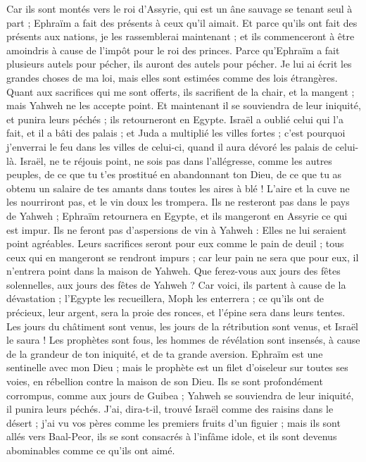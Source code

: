 \begin{multicols}{2}
Car ils sont montés vers le roi d'Assyrie, qui est un âne sauvage se tenant seul à part ; Ephraïm a fait des présents à ceux qu'il aimait.
Et parce qu'ils ont fait des présents aux nations, je les rassemblerai maintenant ; et ils commenceront à être amoindris à cause de l'impôt pour le roi des princes.
Parce qu'Ephraïm a fait plusieurs autels pour pécher, ils auront des autels pour pécher.
Je lui ai écrit les grandes choses de ma loi, mais elles sont estimées comme des lois étrangères.
Quant aux sacrifices qui me sont offerts, ils sacrifient de la chair, et la mangent ; mais Yahweh ne les accepte point. Et maintenant il se souviendra de leur iniquité, et punira leurs péchés ; ils retourneront en Egypte.
Israël a oublié celui qui l'a fait, et il a bâti des palais ; et Juda a multiplié les villes fortes ; c'est pourquoi j'enverrai le feu dans les villes de celui-ci, quand il aura dévoré les palais de celui-là.
\VerseOne{}Israël, ne te réjouis point, ne sois pas dans l'allégresse, comme les autres peuples, de ce que tu t'es prostitué en abandonnant ton Dieu, de ce que tu as obtenu un salaire de tes amants dans toutes les aires à blé !
L'aire et la cuve ne les nourriront pas, et le vin doux les trompera.
Ils ne resteront pas dans le pays de Yahweh ; Ephraïm retournera en Egypte, et ils mangeront en Assyrie ce qui est impur.
Ils ne feront pas d'aspersions de vin à Yahweh : Elles ne lui seraient point agréables. Leurs sacrifices seront pour eux comme le pain de deuil ; tous ceux qui en mangeront se rendront impurs ; car leur pain ne sera que pour eux, il n'entrera point dans la maison de Yahweh.
Que ferez-vous aux jours des fêtes solennelles, aux jours des fêtes de Yahweh ?
Car voici, ils partent à cause de la dévastation ; l'Egypte les recueillera, Moph les enterrera ; ce qu'ils ont de précieux, leur argent, sera la proie des ronces, et l'épine sera dans leurs tentes.
Les jours du châtiment sont venus, les jours de la rétribution sont venus, et Israël le saura ! Les prophètes sont fous, les hommes de révélation sont insensés, à cause de la grandeur de ton iniquité, et de ta grande aversion.
Ephraïm est une sentinelle avec mon Dieu ; mais le prophète est un filet d'oiseleur sur toutes ses voies, en rébellion contre la maison de son Dieu.
Ils se sont profondément corrompus, comme aux jours de Guibea ; Yahweh se souviendra de leur iniquité, il punira leurs péchés.
J'ai, dira-t-il, trouvé Israël comme des raisins dans le désert ; j'ai vu vos pères comme les premiers fruits d'un figuier ; mais ils sont allés vers Baal-Peor, ils se sont consacrés à l'infâme idole, et ils sont devenus abominables comme ce qu'ils ont aimé.

\end{multicols}
